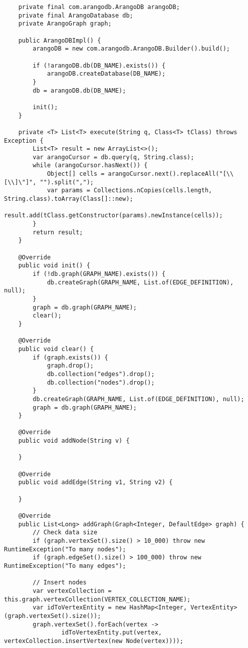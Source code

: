 \begin{lstlisting}
    private final com.arangodb.ArangoDB arangoDB;
    private final ArangoDatabase db;
    private ArangoGraph graph;

    public ArangoDBImpl() {
        arangoDB = new com.arangodb.ArangoDB.Builder().build();

        if (!arangoDB.db(DB_NAME).exists()) {
            arangoDB.createDatabase(DB_NAME);
        }
        db = arangoDB.db(DB_NAME);

        init();
    }

    private <T> List<T> execute(String q, Class<T> tClass) throws Exception {
        List<T> result = new ArrayList<>();
        var arangoCursor = db.query(q, String.class);
        while (arangoCursor.hasNext()) {
            Object[] cells = arangoCursor.next().replaceAll("[\\[\\]\"]", "").split(",");
            var params = Collections.nCopies(cells.length, String.class).toArray(Class[]::new);
            result.add(tClass.getConstructor(params).newInstance(cells));
        }
        return result;
    }

    @Override
    public void init() {
        if (!db.graph(GRAPH_NAME).exists()) {
            db.createGraph(GRAPH_NAME, List.of(EDGE_DEFINITION), null);
        }
        graph = db.graph(GRAPH_NAME);
        clear();
    }

    @Override
    public void clear() {
        if (graph.exists()) {
            graph.drop();
            db.collection("edges").drop();
            db.collection("nodes").drop();
        }
        db.createGraph(GRAPH_NAME, List.of(EDGE_DEFINITION), null);
        graph = db.graph(GRAPH_NAME);
    }

    @Override
    public void addNode(String v) {

    }

    @Override
    public void addEdge(String v1, String v2) {

    }

    @Override
    public List<Long> addGraph(Graph<Integer, DefaultEdge> graph) {
        // Check data size
        if (graph.vertexSet().size() > 10_000) throw new RuntimeException("To many nodes");
        if (graph.edgeSet().size() > 100_000) throw new RuntimeException("To many edges");

        // Insert nodes
        var vertexCollection = this.graph.vertexCollection(VERTEX_COLLECTION_NAME);
        var idToVertexEntity = new HashMap<Integer, VertexEntity>(graph.vertexSet().size());
        graph.vertexSet().forEach(vertex ->
                idToVertexEntity.put(vertex, vertexCollection.insertVertex(new Node(vertex))));


\end{lstlisting}
